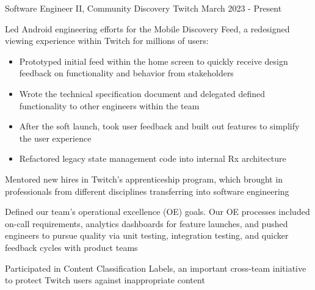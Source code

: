 

\begin{cventries}


  \cventry
    {Software Engineer II, Community Discovery} %
    {Twitch} %
    {} %
    {March 2023 - Present} %
    {
    \begin{cvitems} %
    \item { Led Android engineering efforts for the Mobile Discovery Feed, a redesigned viewing experience within Twitch for millions of users: 
        \begin{itemize}
            \item Prototyped initial feed within the home screen to quickly receive design feedback on functionality and behavior from stakeholders
            \item Wrote the technical specification document and delegated defined functionality to other engineers within the team
            \item After the soft launch, took user feedback and built out features to simplify the user experience
            \item Refactored legacy state management code into internal Rx architecture
        \end{itemize}}
    \item Mentored new hires in Twitch's apprenticeship program, which brought in professionals from different disciplines transferring into software engineering
    \item Defined our team's operational excellence (OE) goals. Our OE processes included on-call requirements, analytics dashboards for feature launches, and pushed engineers to pursue quality via unit testing, integration testing, and quicker feedback cycles with product teams
    \item Participated in Content Classification Labels, an important cross-team initiative to protect Twitch users against inappropriate content
    \end{cvitems}
    }


\end{cventries}
